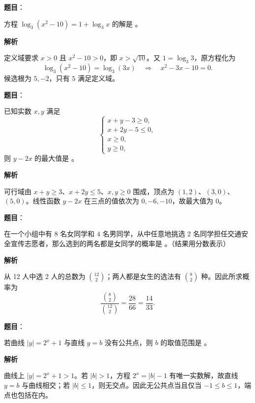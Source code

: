 \begin{answer}

\textbf{题目}：

方程 $\log_3(x^2-10)=1+\log_3x$ 的解是 \gkblank{}。

\textbf{解析}

定义域要求 $x>0$ 且 $x^2-10>0$，即 $x>\sqrt{10}$。又 $1=\log_3 3$，原方程化为
\nopagebreak[4]
\[
\log_3(x^2-10)=\log_3(3x)
\quad\Longrightarrow\quad x^2-3x-10=0.
\]
候选根为 $5,-2$，只有 $5$ 满足定义域。


\end{answer}
\begin{answer}

\textbf{题目}：

已知实数 $x,y$ 满足
\nopagebreak[4]
\[
\begin{cases}
x+y-3\geqslant0,\\
x+2y-5\leqslant0,\\
x\geqslant0,\\
y\geqslant0,
\end{cases}
\]
则 $y-2x$ 的最大值是 \gkblank{}。

\textbf{解析}

可行域由 $x+y\ge3$、$x+2y\le5$、$x,y\ge0$ 围成，顶点为 $(1,2)$、$(3,0)$、$(5,0)$。线性函数 $y-2x$ 在三点的值依次为 $0,-6,-10$，故最大值为 $0$。


\end{answer}
\begin{answer}

\textbf{题目}：

在一个小组中有 8 名女同学和 4 名男同学，从中任意地挑选 2 名同学担任交通安全宣传志愿者，那么选到的两名都是女同学的概率是 \gkblank{}。（结果用分数表示）

\textbf{解析}

从 12 人中选 2 人的总数为 $\binom{12}{2}$；两人都是女生的选法有 $\binom82$ 种。因此所求概率为
\nopagebreak[4]
\[
\frac{\binom82}{\binom{12}2}=\frac{28}{66}=\frac{14}{33}.
\]


\end{answer}
\begin{answer}

\textbf{题目}：

若曲线 $|y|=2^x+1$ 与直线 $y=b$ 没有公共点，则 $b$ 的取值范围是 \gkblank{}。

\textbf{解析}

曲线上 $|y|=2^x+1>1$。若 $|b|>1$，方程 $2^x=|b|-1$ 有唯一实数解，故直线 $y=b$ 与曲线相交；若 $|b|\le1$，则无交点。因此无公共点当且仅当 $-1\le b\le1$，端点也包括在内。


\end{answer}
